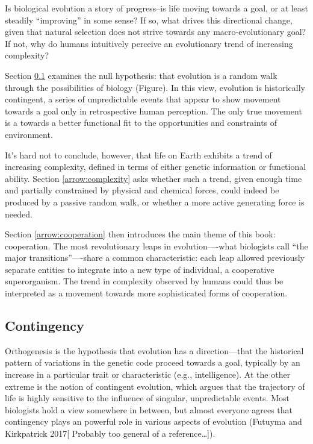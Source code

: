 \documentclass{tufte-book} %
\begin{document}
Is biological evolution a story of progress--is life moving towards a goal, or at least steadily “improving” in some sense? If so, what drives this directional change, given that natural selection does not strive towards any macro-evolutionary goal? If not, why do humans intuitively perceive an evolutionary trend of increasing complexity?

Section \ref{arrow:contingency} examines the null hypothesis: that evolution is a random walk through the possibilities of biology (Figure). In this view, evolution is historically contingent, a series of unpredictable events that appear to show movement towards a goal only in retrospective human perception. The only true movement is a towards a better functional fit to the opportunities and constraints of environment. %

It’s hard not to conclude, however, that life on Earth exhibits a trend of increasing complexity, defined in terms of either genetic information or functional ability. %
Section \ref{arrow:complexity} asks whether such a trend, given enough time and partially constrained by physical and chemical forces, could indeed be produced by a passive random walk, or whether a more active generating force is needed. %

Section \ref{arrow:cooperation} then introduces the main theme of this book: cooperation. The most revolutionary leaps in evolution—-what biologists call “the major transitions”—-share a common characteristic: each leap allowed previously separate entities to integrate into a new type of individual, a cooperative superorganism. The trend in complexity observed by humans could thus be interpreted as a movement towards more sophisticated forms of cooperation. 



\subsection{Contingency}\label{arrow:contingency}

Orthogenesis is the hypothesis that evolution has a direction—that the historical pattern of variations in the genetic code proceed towards a goal, typically by an increase in a particular trait or characteristic (e.g., intelligence). At the other extreme is the notion of contingent evolution, which argues that the trajectory of life is highly sensitive to the influence of singular, unpredictable events. Most biologists hold a view somewhere in between, but almost everyone agrees that  contingency plays an powerful role in various aspects of evolution (Futuyma and Kirkpatrick 2017[ Probably too general of a reference…]). 
\end{document}
